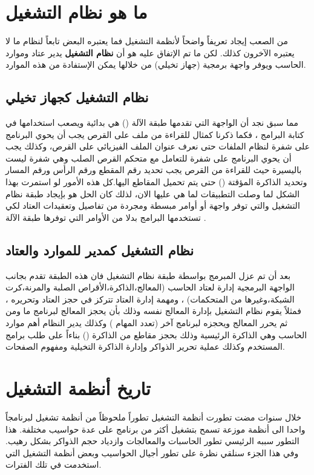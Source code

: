 \documentclass[document.tex]{subfiles}
\begin{document}
\section{ما هو نظام التشغيل}
من الصعب إيجاد تعريفاً واضحاً لأنظمة التشغيل فما يعتبره البعض تابعاً لنظام ما لا يعتبره الآخرون كذلك. لكن ما تم الإتفاق عليه هو أن\textbf{ نظام التشغيل} يدير عتاد وموارد الحاسب ويوفر واجهة برمجية (جهاز تخيلي) من خلالها يمكن الإستفادة من هذه الموارد. 
\subsection{نظام التشغيل كجهاز تخيلي }
مما سبق نجد أن الواجهة التي تقدمها طبقة الآلة () هي بدائية ويصعب استخدامها في كتابة البرامج ، فكما ذكرنا كمثال للقراءة من ملف على القرص يجب أن يحوي البرنامج على شفرة لنظام الملفات حتى نعرف عنوان الملف الفيزيائي على القرص، وكذلك يجب أن يحوي البرنامج على شفرة للتعامل مع متحكم القرص الصلب وهي شفرة ليست باليسيرة حيث للقراءة من القرص يجب تحديد رقم المقطع ورقم الرأس ورقم المسار وتحديد الذاكرة المؤقتة () حتى يتم تحميل المقاطع اليها.كل هذه الأمور لو استمرت بهذا الشكل لما وصلت التطبيقات لما هي عليها الان، لذلك كان الحل هو بإيجاد طبقة نظام التشغيل والتي توفر واجهة أو أوامر مبسطة ومجردة من تفاصيل وتعقيدات العتاد لكي تستخدمها البرامج بدلا من الأوامر التي توفرها طبقة الآلة .

\subsection{نظام التشغيل كمدير للموارد والعتاد}
بعد أن تم عزل المبرمج بواسطة طبقة نظام التشغيل فان هذه الطبقة تقدم بجانب الواجهة البرمجية إدارة لعتاد الحاسب (المعالج،الذاكرة،الأقراص الصلبة والمرنة،كرت الشبكة،وغيرها من المتحكمات) ، ومهمة إدارة العتاد تتركز في حجز العتاد وتحريره ، فمثلاً يقوم نظام التشغيل بإدارة المعالج نفسه وذلك بأن يحجز المعالج لبرنامج ما ومن ثم يحرر المعالج ويحجزه لبرنامج آخر (تعدد المهام ) وكذلك يدير النظام أهم موارد الحاسب وهي الذاكرة الرئيسية وذلك بحجز مقاطع من الذاكرة () بناءاً على طلب برامج المستخدم وكذلك عملية تحرير الذواكر وإدارة الذاكرة التخيلية ومفهوم الصفحات. 

\section{تاريخ أنظمة التشغيل}
خلال سنوات مضت تطورت أنظمة التشغيل تطوراً ملحوظاً من أنظمة تشغيل لبرنامجاً واحدا الى أنظمة موزعة تسمح بتشغيل أكثر من برنامج على عدة حواسيب مختلفة. هذا التطور سببه الرئيسي تطور الحاسبات والمعالجات وازدياد حجم الذواكر بشكل رهيب. وفي هذا الجزء سنلقي نظرة على تطور أجيال الحواسيب وبعض أنظمة التشغيل التي استخدمت في تلك الفترات.
 
\end{document}
